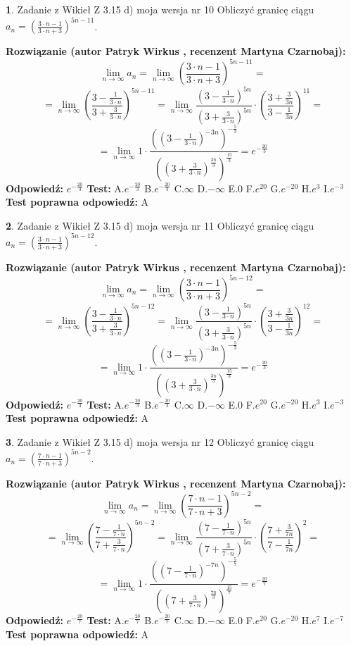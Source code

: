 \documentclass[12pt, a4paper]{article}
\theoremstyle{definition} %
\newtheorem{zad}{}
\newcommand{\zadStart}[1]{\begin{zad}#1\newline}
\newcommand{\zadStop}{\end{zad}}
\newcommand{\rozwStart}[2]{\noindent \textbf{Rozwiązanie (autor #1 , recenzent #2): }\newline}
\newcommand{\rozwStop}{\newline}
\newcommand{\odpStart}{\noindent \textbf{Odpowiedź:}\newline}
\newcommand{\odpStop}{\newline}
\newcommand{\testStart}{\noindent \textbf{Test:}\newline}
\newcommand{\testStop}{\newline}
\newcommand{\kluczStart}{\noindent \textbf{Test poprawna odpowiedź:}\newline}
\newcommand{\kluczStop}{\newline}
\begin{document}
\zadStart{Zadanie z Wikieł Z 3.15 d) moja wersja nr 10}
Obliczyć granicę ciągu $a_{n}=(\frac{3\cdot n - 1}{3 \cdot n + 3})^{5n-11}$.
\zadStop
\rozwStart{Patryk Wirkus}{Martyna Czarnobaj}
$$\lim\limits_{n\to\infty} a_{n} = \lim\limits_{n\to\infty}(\frac{3\cdot n - 1}{3 \cdot n + 3})^{5n-11}=$$
$$=\lim\limits_{n\to\infty}(\frac{3 - \frac{1}{3\cdot n}}{3 + \frac{3}{3 \cdot n}})^{5n-11}=\lim\limits_{n\to\infty}\frac{(3 - \frac{1}{3\cdot n})^{5n}}{(3 + \frac{3}{3\cdot n})^{5n}} \cdot (\frac{3+\frac{3}{3n}}{3-\frac{1}{3n}})^{11}=$$
$$=\lim\limits_{n\to\infty} 1 \cdot \frac{((3-\frac{1}{3 \cdot n})^{-3n})^{-\frac{5}{3}}}{((3+\frac{3}{3 \cdot n})^{\frac{3n}{3}})^{\frac{15}{3}}} =e^{-\frac{20}{3}}$$
\rozwStop
\odpStart
$e^{-\frac{20}{3}}$
\odpStop
\testStart
A.$ e^{-\frac{20}{3}}$
B.$ e^{-\frac{20}{3}}$
C.$\infty$
D.$-\infty$
E.$0$
F.$e^{20}$
G.$e^{-20}$
H.$e^{3}$
I.$e^{-3}$
\testStop
\kluczStart
A
\kluczStop



\zadStart{Zadanie z Wikieł Z 3.15 d) moja wersja nr 11}
Obliczyć granicę ciągu $a_{n}=(\frac{3\cdot n - 1}{3 \cdot n + 3})^{5n-12}$.
\zadStop
\rozwStart{Patryk Wirkus}{Martyna Czarnobaj}
$$\lim\limits_{n\to\infty} a_{n} = \lim\limits_{n\to\infty}(\frac{3\cdot n - 1}{3 \cdot n + 3})^{5n-12}=$$
$$=\lim\limits_{n\to\infty}(\frac{3 - \frac{1}{3\cdot n}}{3 + \frac{3}{3 \cdot n}})^{5n-12}=\lim\limits_{n\to\infty}\frac{(3 - \frac{1}{3\cdot n})^{5n}}{(3 + \frac{3}{3\cdot n})^{5n}} \cdot (\frac{3+\frac{3}{3n}}{3-\frac{1}{3n}})^{12}=$$
$$=\lim\limits_{n\to\infty} 1 \cdot \frac{((3-\frac{1}{3 \cdot n})^{-3n})^{-\frac{5}{3}}}{((3+\frac{3}{3 \cdot n})^{\frac{3n}{3}})^{\frac{15}{3}}} =e^{-\frac{20}{3}}$$
\rozwStop
\odpStart
$e^{-\frac{20}{3}}$
\odpStop
\testStart
A.$ e^{-\frac{20}{3}}$
B.$ e^{-\frac{20}{3}}$
C.$\infty$
D.$-\infty$
E.$0$
F.$e^{20}$
G.$e^{-20}$
H.$e^{3}$
I.$e^{-3}$
\testStop
\kluczStart
A
\kluczStop



\zadStart{Zadanie z Wikieł Z 3.15 d) moja wersja nr 12}
Obliczyć granicę ciągu $a_{n}=(\frac{7\cdot n - 1}{7 \cdot n + 3})^{5n-2}$.
\zadStop
\rozwStart{Patryk Wirkus}{Martyna Czarnobaj}
$$\lim\limits_{n\to\infty} a_{n} = \lim\limits_{n\to\infty}(\frac{7\cdot n - 1}{7 \cdot n + 3})^{5n-2}=$$
$$=\lim\limits_{n\to\infty}(\frac{7 - \frac{1}{7\cdot n}}{7 + \frac{3}{7 \cdot n}})^{5n-2}=\lim\limits_{n\to\infty}\frac{(7 - \frac{1}{7\cdot n})^{5n}}{(7 + \frac{3}{7\cdot n})^{5n}} \cdot (\frac{7+\frac{3}{7n}}{7-\frac{1}{7n}})^{2}=$$
$$=\lim\limits_{n\to\infty} 1 \cdot \frac{((7-\frac{1}{7 \cdot n})^{-7n})^{-\frac{5}{7}}}{((7+\frac{3}{7 \cdot n})^{\frac{7n}{3}})^{\frac{15}{7}}} =e^{-\frac{20}{7}}$$
\rozwStop
\odpStart
$e^{-\frac{20}{7}}$
\odpStop
\testStart
A.$ e^{-\frac{20}{7}}$
B.$ e^{-\frac{20}{7}}$
C.$\infty$
D.$-\infty$
E.$0$
F.$e^{20}$
G.$e^{-20}$
H.$e^{7}$
I.$e^{-7}$
\testStop
\kluczStart
A
\kluczStop
\end{document}
